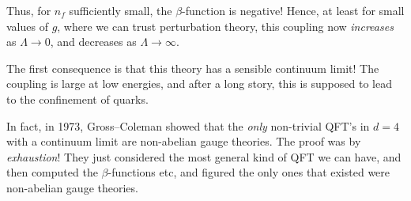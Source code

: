 \documentclass[a4paper]{article}
\begin{document}
Thus, for $n_f$ sufficiently small, the $\beta$-function is negative! Hence, at least for small values of $g$, where we can trust perturbation theory, this coupling now \emph{increases} as $\Lambda \to 0$, and decreases as $\Lambda \to \infty$.

The first consequence is that this theory has a sensible continuum limit! The coupling is large at low energies, and after a long story, this is supposed to lead to the confinement of quarks.

In fact, in 1973, Gross--Coleman showed that the \emph{only} non-trivial QFT's in $d = 4$ with a continuum limit are non-abelian gauge theories. The proof was by \emph{exhaustion}! They just considered the most general kind of QFT we can have, and then computed the $\beta$-functions etc, and figured the only ones that existed were non-abelian gauge theories.


\printindex
\end{document}
